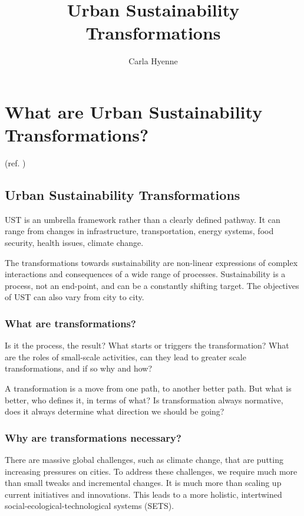 \documentclass{article}
\title{Urban Sustainability Transformations}
\author{Carla Hyenne}
\begin{document}
\maketitle

\tableofcontents

\pagebreak

\section{What are Urban Sustainability Transformations?}

(ref. \cite{mcphearson2021radical})

\subsection{Urban Sustainability Transformations}

UST is an umbrella framework rather than a clearly defined pathway. It can range from changes in infrastructure, transportation, energy systems, food security, health issues, climate change. 

The transformations towards sustainability are non-linear expressions of complex interactions and consequences of a wide range of processes. Sustainability is a process, not an end-point, and can be a constantly shifting target.
The objectives of UST can also vary from city to city.

\subsubsection{What are transformations?}

Is it the process, the result? What starts or triggers the transformation? What are the roles of small-scale activities, can they lead to greater scale transformations, and if so why and how?

A transformation is a move from one path, to another better path. But what is better, who defines it, in terms of what? Is transformation always normative, does it always determine what direction we should be going?

\subsubsection{Why are transformations necessary?}

There are massive global challenges, such as climate change, that are putting increasing pressures on cities. To address these challenges, we require much more than small tweaks and incremental changes.
It is much more than scaling up current initiatives and innovations. This leads to a more holistic, intertwined social-ecological-technological systems (SETS).
\end{document}
